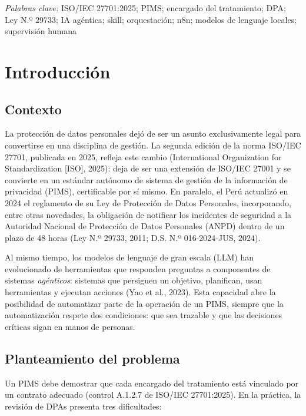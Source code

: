 \documentclass[12pt,letterpaper]{article}
\begin{document}
\vspace{10pt}
\noindent\textit{Palabras clave:} ISO/IEC 27701:2025; PIMS; encargado del tratamiento; DPA; Ley N.º 29733; IA agéntica; skill; orquestación; n8n; modelos de lenguaje locales; supervisión humana

\newpage
\tableofcontents
\newpage

\section{Introducción}

\subsection{Contexto}

La protección de datos personales dejó de ser un asunto exclusivamente legal para convertirse en una disciplina de gestión. La segunda edición de la norma ISO/IEC 27701, publicada en 2025, refleja este cambio (International Organization for Standardization [ISO], 2025): deja de ser una extensión de ISO/IEC 27001 y se convierte en un estándar autónomo de sistema de gestión de la información de privacidad (PIMS), certificable por sí mismo. En paralelo, el Perú actualizó en 2024 el reglamento de su Ley de Protección de Datos Personales, incorporando, entre otras novedades, la obligación de notificar los incidentes de seguridad a la Autoridad Nacional de Protección de Datos Personales (ANPD) dentro de un plazo de 48 horas (Ley N.º 29733, 2011; D.S. N.º 016-2024-JUS, 2024).

Al mismo tiempo, los modelos de lenguaje de gran escala (LLM) han evolucionado de herramientas que responden preguntas a componentes de sistemas \emph{agénticos}: sistemas que persiguen un objetivo, planifican, usan herramientas y ejecutan acciones (Yao et al., 2023). Esta capacidad abre la posibilidad de automatizar parte de la operación de un PIMS, siempre que la automatización respete dos condiciones: que sea trazable y que las decisiones críticas sigan en manos de personas.

\subsection{Planteamiento del problema}

Un PIMS debe demostrar que cada encargado del tratamiento está vinculado por un contrato adecuado (control A.1.2.7 de ISO/IEC 27701:2025). En la práctica, la revisión de DPAs presenta tres dificultades:
\end{document}
